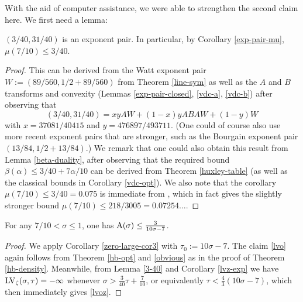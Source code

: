 With the aid of computer assistance, we were able to strengthen the second claim here.  We first need a lemma:

\begin{lemma}\label{3-40} $(3/40, 31/40)$ is an exponent pair.  In particular, by Corollary \ref{exp-pair-mu}, $\mu(7/10) \leq 3/40$.
\end{lemma}

\derived
{}

\begin{proof}  This can be derived from the Watt exponent pair $W := (89/560, 1/2 + 89/560)$ from Theorem \ref{line-sym} as well as the $A$ and $B$ transforms and convexity (Lemmas \ref{exp-pair-closed}, \ref{vdc-a}, \ref{vdc-b}) after observing that
$$(3/40,31/40) = xy AW + (1-x)y ABA W + (1-y) W$$
with $x=37081/40415$ and $y=476897/493711$.  (One could of course also use more recent exponent pairs that are stronger, such as the Bourgain exponent pair $(13/84, 1/2+13/84)$.)  We remark that one could also obtain this result from Lemma \ref{beta-duality}, after observing that the required bound $\beta(\alpha) \leq 3/40 + 7\alpha/10$ can be derived from Theorem \ref{huxley-table} (as well as the classical bounds in Corollary \ref{vdc-opt}).  We also note that the corollary $\mu(7/10) \leq 3/40 = 0.075$ is immediate from \cite[Theorem 2.4]{trudgian-yang}, which in fact gives the slightly stronger bound $\mu(7/10) \leq 218/3005 = 0.07254\dots$.
\end{proof}

\begin{theorem}\label{hb-density2} For any $7/10 < \sigma \leq 1$, one has $\mathrm{A}(\sigma) \leq \frac{3}{10\sigma-7}$.
\end{theorem}
\derived
{}

\begin{proof}  We apply Corollary \ref{zero-large-cor3} with $\tau_0 := 10\sigma-7$.  The claim \eqref{lvo} again follows from
    Theorem \ref{hb-opt} and \eqref{obvious} as in the proof of Theorem \ref{hb-density}.  Meanwhile, from Lemma \ref{3-40} and Corollary \ref{lvz-exp} we have $\mathrm{LV}_\zeta(\sigma,\tau) = -\infty$ whenever $\sigma > \frac{3}{40} \tau + \frac{7}{10}$, or equivalently $\tau < \frac{4}{3} (10\sigma-7)$, which then immediately gives \eqref{lvoz}.
\end{proof}

